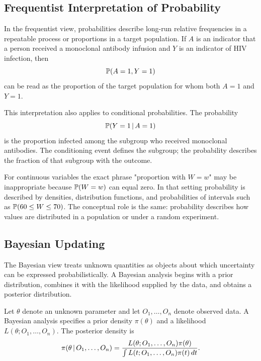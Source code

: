 \label{lec:1-2}

\subsection{Frequentist Interpretation of Probability}

In the frequentist view, probabilities describe long-run relative frequencies in a repeatable process or proportions in a target population. If $A$ is an indicator that a person received a monoclonal antibody infusion and $Y$ is an indicator of HIV infection, then
\[
\mathbb{P}(A=1,Y=1)
\]
can be read as the proportion of the target population for whom both $A=1$ and $Y=1$.

This interpretation also applies to conditional probabilities. The probability
\[
\mathbb{P}(Y=1\,\vert\, A=1)
\]
is the proportion infected among the subgroup who received monoclonal antibodies. The conditioning event defines the subgroup; the probability describes the fraction of that subgroup with the outcome.

For continuous variables the exact phrase "proportion with $W=w$" may be inappropriate because $\mathbb{P}(W=w)$ can equal zero. In that setting probability is described by densities, distribution functions, and probabilities of intervals such as $\mathbb{P}(60\le W\le 70)$. The conceptual role is the same: probability describes how values are distributed in a population or under a random experiment.

\subsection{Bayesian Updating}

The Bayesian view treats unknown quantities as objects about which uncertainty can be expressed probabilistically. A Bayesian analysis begins with a prior distribution, combines it with the likelihood supplied by the data, and obtains a posterior distribution.

\begin{definition}
Let $\theta$ denote an unknown parameter and let $O_1,\ldots,O_n$ denote observed data. A Bayesian analysis specifies a prior density $\pi(\theta)$ and a likelihood $L(\theta;O_1,\ldots,O_n)$. The posterior density is
\[
\pi(\theta\,\vert\, O_1,\ldots,O_n)
=
\frac{L(\theta;O_1,\ldots,O_n)\pi(\theta)}
{\int L(t;O_1,\ldots,O_n)\pi(t)\,dt}.
\]
\end{definition}

